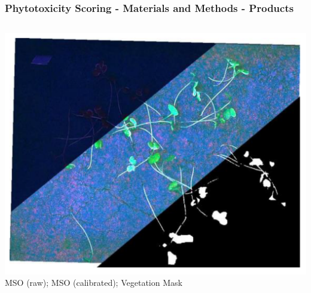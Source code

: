 \documentclass[aspectratio=43]{beamer}
\begin{document}
\begin{frame}
    \frametitle{\small Phytotoxicity Scoring - Materials and Methods - Products}
    
    \begin{columns}
        \begin{column}{0.5\textwidth}
            \includegraphics[width=\textwidth]{Imgs/agronomy-14-00306-g006.png}
        \center
            \tiny MSO (raw); MSO (calibrated); Vegetation Mask
        \end{column}
        

\end{columns}
\end{frame}
\end{document}
